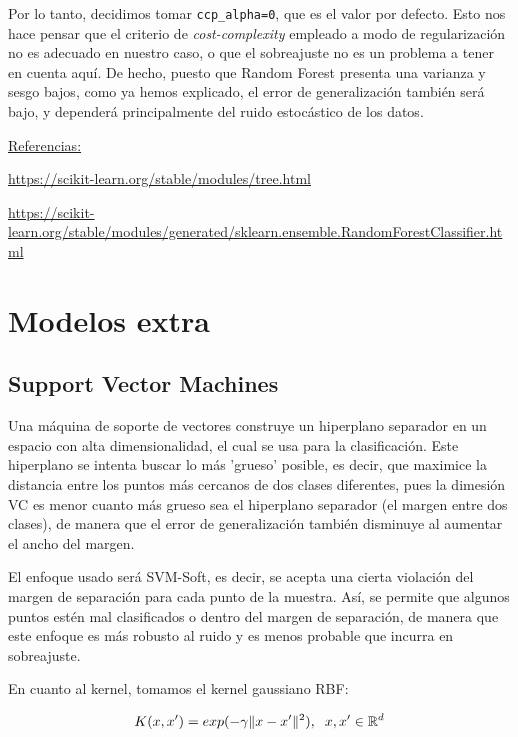 \documentclass[a4]{article}
\begin{document}
Por lo tanto, decidimos tomar \lstinline{ccp_alpha=0}, que es el valor por defecto. Esto nos hace pensar que el criterio de \textit{cost-complexity} empleado a modo de regularización no es adecuado en nuestro caso, o que el sobreajuste no es un problema a tener en cuenta aquí. De hecho, puesto que Random Forest presenta una varianza y sesgo bajos, como ya hemos explicado, el error de generalización también será bajo, y dependerá principalmente del ruido estocástico de los datos.

\underline{Referencias:}

\href{https://scikit-learn.org/stable/modules/tree.html#minimal-cost-complexity-pruning}{https://scikit-learn.org/stable/modules/tree.html}

\href{https://scikit-learn.org/stable/modules/generated/sklearn.ensemble.RandomForestClassifier.html}{https://scikit-learn.org/stable/modules/generated/sklearn.ensemble.RandomForestClassifier.html}

\section{Modelos extra}

\subsection{Support Vector Machines}

Una máquina de soporte de vectores construye un hiperplano separador en un espacio con alta dimensionalidad, el cual se usa para la clasificación. Este hiperplano se intenta buscar lo más 'grueso' posible, es decir, que maximice la distancia entre los puntos más cercanos de dos clases diferentes, pues la dimesión VC es menor cuanto más grueso sea el hiperplano separador (el margen entre dos clases), de manera que el error de generalización también disminuye al aumentar el ancho del margen.   

El enfoque usado será SVM-Soft, es decir, se acepta una cierta violación del margen de separación para cada punto de la muestra. Así, se permite que algunos puntos estén mal clasificados o dentro del margen de separación, de manera que este enfoque es más robusto al ruido y es menos probable que incurra en sobreajuste. 

En cuanto al kernel, tomamos el kernel gaussiano RBF:

$$K(x,x')=exp(-\gamma\|x-x'\|^2),\hspace{2mm} x,x'\in \mathbb{R}^d$$
\end{document}
